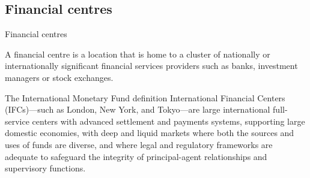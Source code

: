 \documentclass[international_finance_p1.tex]{subfiles}
\begin{document}
\subsection{Financial centres}
\begin{frame}[shrink=10]{Financial centres}
\begin{block}{A financial centre}
 is a location that is home to a cluster of nationally or internationally significant financial services providers such as banks, investment managers or stock exchanges. 
\end{block}
\begin{block}{The International Monetary Fund definition}
    International Financial Centers (IFCs)—such as London, New York, and Tokyo—are large international full-service centers with advanced settlement and payments systems, supporting large domestic economies, with deep and liquid markets where both the sources and uses of funds are diverse, and where legal and regulatory frameworks are adequate to safeguard the integrity of principal-agent relationships and supervisory functions.
\end{block}
\end{frame}
\end{document}

